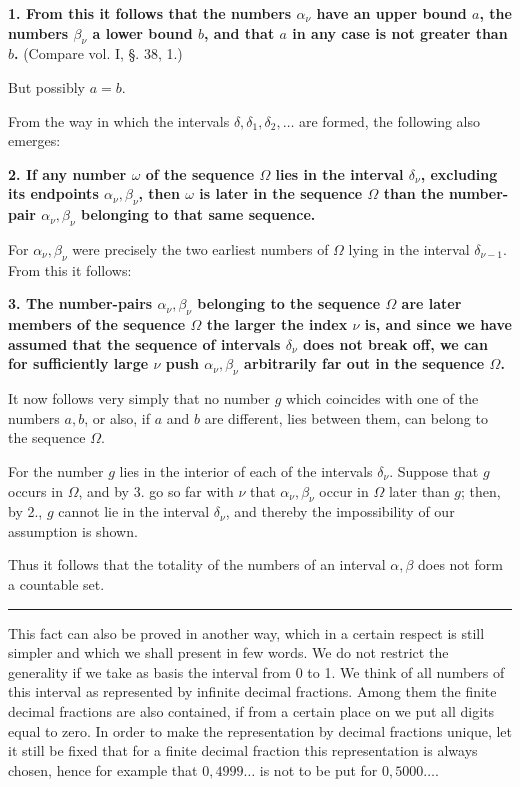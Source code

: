 \documentclass[11pt]{article}
\begin{document}
\textbf{1. From this it follows that the numbers $\alpha_\nu$ have an upper bound $a$, the numbers $\beta_\nu$ a lower bound $b$, and that $a$ in any case is not greater than $b$.} (Compare vol. I, §. 38, 1.)

But possibly $a=b$.

From the way in which the intervals $\delta,\delta_1,\delta_2,\ldots$ are formed, the following also emerges:

\textbf{2. If any number $\omega$ of the sequence $\Omega$ lies in the interval $\delta_\nu$, excluding its endpoints $\alpha_\nu,\beta_\nu$, then $\omega$ is later in the sequence $\Omega$ than the number-pair $\alpha_\nu,\beta_\nu$ belonging to that same sequence.}

For $\alpha_\nu,\beta_\nu$ were precisely the two earliest numbers of $\Omega$ lying in the interval $\delta_{\nu-1}$. From this it follows:

\textbf{3. The number-pairs $\alpha_\nu,\beta_\nu$ belonging to the sequence $\Omega$ are later members of the sequence $\Omega$ the larger the index $\nu$ is, and since we have assumed that the sequence of intervals $\delta_\nu$ does not break off, we can for sufficiently large $\nu$ push $\alpha_\nu,\beta_\nu$ arbitrarily far out in the sequence $\Omega$.}

It now follows very simply that no number $g$ which coincides with one of the numbers $a,b$, or also, if $a$ and $b$ are different, lies between them, can belong to the sequence $\Omega$.

For the number $g$ lies in the interior of each of the intervals $\delta_\nu$. Suppose that $g$ occurs in $\Omega$, and by 3. go so far with $\nu$ that $\alpha_\nu,\beta_\nu$ occur in $\Omega$ later than $g$; then, by 2., $g$ cannot lie in the interval $\delta_\nu$, and thereby the impossibility of our assumption is shown.

Thus it follows that the totality of the numbers of an interval $\alpha,\beta$ does not form a countable set.

\medskip\hrule\medskip

This fact can also be proved in another way, which in a certain respect is still simpler and which we shall present in few words. We do not restrict the generality if we take as basis the interval from 0 to 1. We think of all numbers of this interval as represented by infinite decimal fractions. Among them the finite decimal fractions are also contained, if from a certain place on we put all digits equal to zero. In order to make the representation by decimal fractions unique, let it still be fixed that for a finite decimal fraction this representation is always chosen, hence for example that $0{,}4999\ldots$ is not to be put for $0{,}5000\ldots$.
\end{document}
